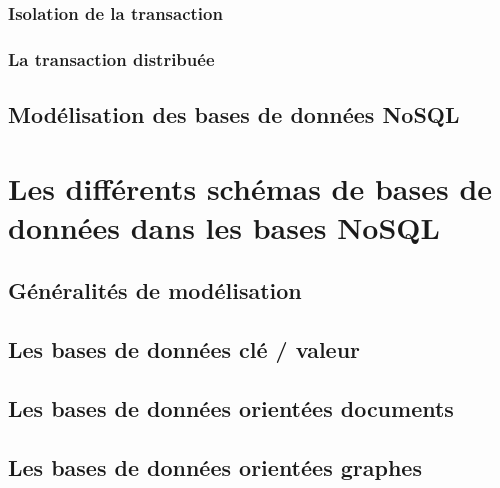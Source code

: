 \documentclass[12pt,titlepage,a4paper]{report}
\begin{document}
			\subsection{Isolation de la transaction}
			\subsection{La transaction distribuée}

		\section{Modélisation des bases de données NoSQL}
			

	\chapter{Les différents schémas de bases de données dans les bases NoSQL}
	\minitoc
		
		\section{Généralités de modélisation}
			

		\section{Les bases de données clé / valeur}
			

		\section{Les bases de données orientées documents}
		\section{Les bases de données orientées graphes}

	
	
\end{document}
